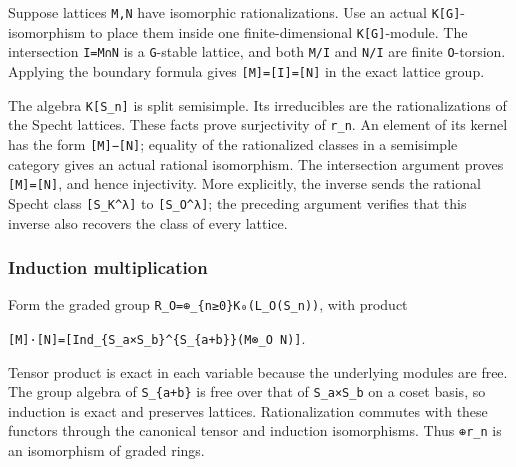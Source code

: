 \documentclass[
  10pt,
]{article}
\begin{document}
Suppose lattices \texttt{\small M,\allowbreak{}N} have isomorphic
rationalizations. Use an actual
\texttt{\small K[\allowbreak{}G]\allowbreak{}}-isomorphism to place them
inside one finite-dimensional
\texttt{\small K[\allowbreak{}G]\allowbreak{}}-module. The intersection
\texttt{\small I=\allowbreak{}M∩N} is a \texttt{\small G}-stable
lattice, and both \texttt{\small M/\allowbreak{}I} and
\texttt{\small N/\allowbreak{}I} are finite \texttt{\small O}-torsion.
Applying the boundary formula gives
\texttt{\small [\allowbreak{}M]\allowbreak{}=\allowbreak{}[\allowbreak{}I]\allowbreak{}=\allowbreak{}[\allowbreak{}N]\allowbreak{}}
in the exact lattice group.

The algebra
\texttt{\small K[\allowbreak{}S\_\allowbreak{}n]\allowbreak{}} is split
semisimple. Its irreducibles are the rationalizations of the Specht
lattices. These facts prove surjectivity of
\texttt{\small r\_\allowbreak{}n}. An element of its kernel has the form
\texttt{\small [\allowbreak{}M]\allowbreak{}−[\allowbreak{}N]\allowbreak{}};
equality of the rationalized classes in a semisimple category gives an
actual rational isomorphism. The intersection argument proves
\texttt{\small [\allowbreak{}M]\allowbreak{}=\allowbreak{}[\allowbreak{}N]\allowbreak{}},
and hence injectivity. More explicitly, the inverse sends the rational
Specht class
\texttt{\small [\allowbreak{}S\_\allowbreak{}K\textasciicircum{}λ]\allowbreak{}}
to
\texttt{\small [\allowbreak{}S\_\allowbreak{}O\textasciicircum{}λ]\allowbreak{}};
the preceding argument verifies that this inverse also recovers the
class of every lattice.

\subsubsection{Induction multiplication}\label{induction-multiplication}

Form the graded group
\texttt{\small R\_\allowbreak{}O=\allowbreak{}⊕\allowbreak{}\_\allowbreak{}\{n≥\allowbreak{}0\}K₀(\allowbreak{}L\_\allowbreak{}O(\allowbreak{}S\_\allowbreak{}n)\allowbreak{})\allowbreak{}},
with product

\texttt{\small [\allowbreak{}M]\allowbreak{}·[\allowbreak{}N]\allowbreak{}=\allowbreak{}[\allowbreak{}Ind\_\allowbreak{}\{S\_\allowbreak{}a×S\_\allowbreak{}b\}\textasciicircum{}\{S\_\allowbreak{}\{a+\allowbreak{}b\}\}(\allowbreak{}M⊗\allowbreak{}\_\allowbreak{}O N)\allowbreak{}]\allowbreak{}}.

Tensor product is exact in each variable because the underlying modules
are free. The group algebra of
\texttt{\small S\_\allowbreak{}\{a+\allowbreak{}b\}} is free over that
of \texttt{\small S\_\allowbreak{}a×S\_\allowbreak{}b} on a coset basis,
so induction is exact and preserves lattices. Rationalization commutes
with these functors through the canonical tensor and induction
isomorphisms. Thus \texttt{\small ⊕\allowbreak{}r\_\allowbreak{}n} is an
isomorphism of graded rings.
\end{document}
